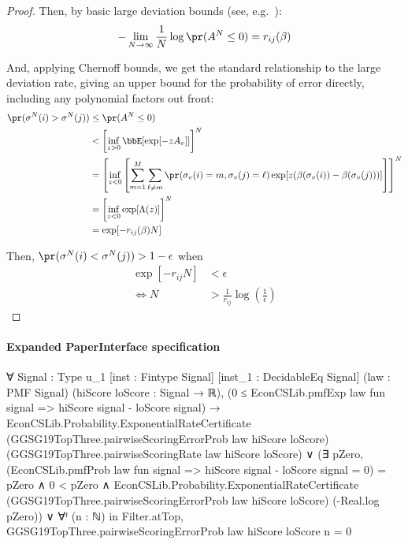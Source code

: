 \documentclass[10pt]{article}
\begin{document}
\begin{ReviewVerbatim}
\begin{proof}
	Then, by basic large deviation bounds (see, e.g.~\citet{dembo_large_2010}):
	\begin{align*}
	-\lim_{N\to \infty} \frac{1}{N} \log \pr(A^N \leq 0) &= r_{ij}(\beta)\\
%
	\end{align*}


	And, applying Chernoff bounds, we get the standard relationship to the large deviation rate, giving an upper bound for the probability of error directly, including any polynomial factors out front:
		\begin{align*}
	\pr(\sigma^N(i) > \sigma^N(j)) &\leq \pr(A^N \leq 0) \\
	&< \left[\inf_{z>0}\bbE[\exp[-zA_v]]\right]^N\\
%
	&= \left[\inf_{z<0}\left[\sum_{m=1}^M \sum_{\ell\neq m} \pr(\sigma_v(i) = m, \sigma_v(j)=\ell) \exp[ z(\beta(\sigma_v(i)) - \beta(\sigma_v(j)))]\right]\right]^N\\
		&= \left[\inf_{z<0} \exp[\Lambda(z)]\right]^N\\
		&= \exp[-r_{ij}(\beta)N]
	\end{align*}

Then, $\pr(\sigma^N(i) < \sigma^N(j)) > 1-\epsilon$ when
\begin{align*}
\exp[-r_{ij}N] &< \epsilon\\
\iff N&> \frac{1}{r_{ij}}\log\left(\frac{1}{\epsilon}\right)
\end{align*}

\end{proof}
\end{ReviewVerbatim}


\paragraph{Expanded PaperInterface specification}
\begin{ReviewVerbatim}
∀ {Signal : Type u_1} [inst : Fintype Signal] [inst_1 : DecidableEq Signal] (law : PMF Signal)
  (hiScore loScore : Signal → ℝ),
  (0 ≤ EconCSLib.pmfExp law fun signal => hiScore signal - loScore signal) →
    EconCSLib.Probability.ExponentialRateCertificate (GGSG19TopThree.pairwiseScoringErrorProb law hiScore loScore)
        (GGSG19TopThree.pairwiseScoringRate law hiScore loScore) ∨
      (∃ pZero,
          (EconCSLib.pmfProb law fun signal => hiScore signal - loScore signal = 0) = pZero ∧
            0 < pZero ∧
              EconCSLib.Probability.ExponentialRateCertificate
                (GGSG19TopThree.pairwiseScoringErrorProb law hiScore loScore) (-Real.log pZero)) ∨
        ∀ᶠ (n : ℕ) in Filter.atTop, GGSG19TopThree.pairwiseScoringErrorProb law hiScore loScore n = 0
\end{ReviewVerbatim}
\end{document}
